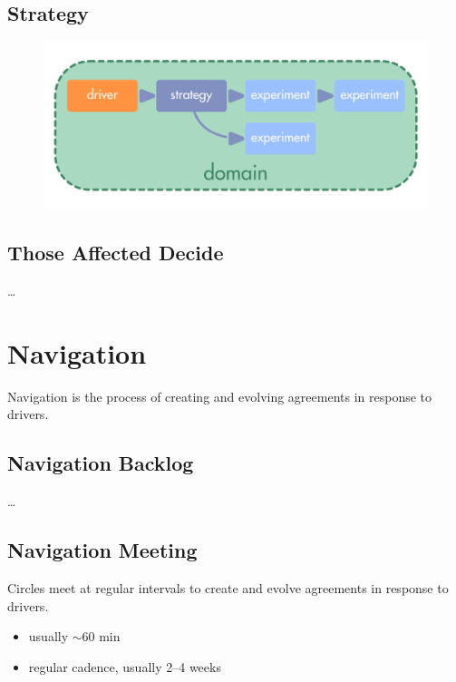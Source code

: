 \section{Strategy}
\label{strategy}

\begin{figure}[htbp]
\centering
\includegraphics[keepaspectratio,width=\textwidth,height=0.75\textheight]{img/drivers-and-subdrivers/driver-and-domains.png}
\end{figure}

\section{Those Affected Decide}
\label{thoseaffecteddecide}

{\ldots}

\chapter{Navigation}
\label{navigation}

Navigation is the process of creating and evolving agreements in response to drivers.

\section{Navigation Backlog}
\label{navigationbacklog}

{\ldots}

\section{Navigation Meeting}
\label{navigationmeeting}

Circles meet at regular intervals to create and evolve agreements in response to drivers.

\begin{itemize}
\item usually \ensuremath{\sim}60 min

\item regular cadence, usually 2--4 weeks

\end{itemize}

